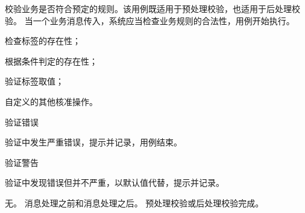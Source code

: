 \documentclass[cs4size,a4paper,nofonts]{ctexart}
\begin{document}
{校验业务是否符合预定的规则。该用例既适用于预处理校验，也适用于后处理校验。} %
{当一个业务消息传入，系统应当检查业务规则的合法性，用例开始执行。} %
{
\item 检查标签的存在性；
\item 根据条件判定的存在性；
\item 验证标签取值；
\item 自定义的其他核准操作。
} %
{} %
{
\item 验证错误\par
验证中发生严重错误，提示并记录，用例结束。
\item 验证警告\par
验证中发现错误但并不严重，以默认值代替，提示并记录。
} %
{无。} %
{消息处理之前和消息处理之后。} %
{预处理校验或后处理校验完成。} %

\end{document}
